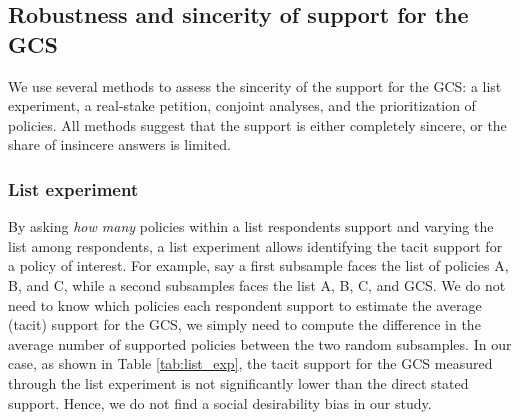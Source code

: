 \begin{bibunit}
\subsection{Robustness and sincerity of support for the GCS}\label{subsec:robustness_sincerity}


We use several methods to assess the sincerity of the support for the GCS: a list experiment, a real-stake petition, conjoint analyses, and the prioritization of policies. All methods suggest that the support is either completely sincere, or the share of insincere answers is limited. 

\subsubsection{List experiment}\label{subsubsec:list_exp} %

By asking \textit{how many} policies within a list respondents support and varying the list among respondents, a list experiment allows identifying the tacit support for a policy of interest. 
For example, say a first subsample faces the list of policies A, B, and C, while a second subsamples faces the list A, B, C, and GCS. We do not need to know which policies each respondent support to estimate the average (tacit) support for the GCS, we simply need to compute the difference in the average number of supported policies between the two random subsamples.\citep{imai_multivariate_2011} 
In our case, as shown in Table \ref{tab:list_exp}, the tacit support for the GCS measured through the list experiment is not significantly lower than the direct stated support. %
Hence, we do not find a social desirability bias in our study.


\end{bibunit}
